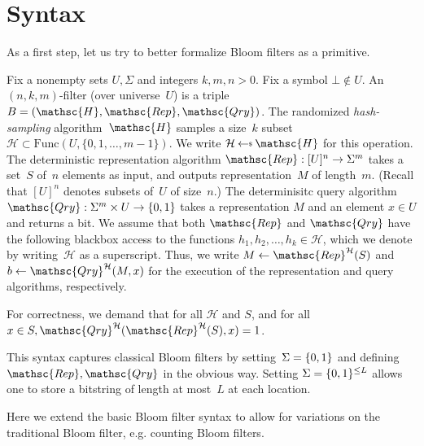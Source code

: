 \section{Syntax}
As a first step, let us try to better formalize Bloom filters as a primitive.

Fix a nonempty sets $U,\Sigma$ and integers $k,m,n>0$.  Fix a symbol $\bot \not\in U$.  An $(n,k,m)$-filter (over universe~$U$) is a triple  $B=(\mathsc{H},\mathsc{Rep},\mathsc{Qry})$.   
%
The randomized \emph{hash-sampling} algorithm~$\mathsc{H}$ samples a size~$k$ subset~$\mathcal{H} \subset \mathrm{Func}(U,\{0,1,\ldots,m-1\})$.  We write $\mathcal{H} \getsr \mathsc{H}$ for this operation.
%
The deterministic representation algorithm $\mathsc{Rep}: [U]^n \rightarrow \Sigma^m$ takes a set~$S$ of~$n$ elements as input, and outputs representation~$M$ of length~$m$.  (Recall that $[U]^n$ denotes subsets of~$U$ of size~$n$.)
%
The determinisitc query algorithm $\mathsc{Qry}: \Sigma^m \times U \rightarrow \bits$ takes a representation $M$ and an element $x \in U$ and returns a bit.  
%
We assume that both $\mathsc{Rep}$ and $\mathsc{Qry}$ have the following blackbox access to the functions $h_1,h_2,\ldots,h_k \in \mathcal{H}$, which we denote by writing~$\mathcal{H}$ as a superscript.   Thus, we write $M \gets \mathsc{Rep}^{\mathcal{H}}(S)$ and $b \gets \mathsc{Qry}^{\mathcal{H}}(M,x)$ for the execution of the representation and query algorithms, respectively.

For correctness, we demand that for all $\mathcal{H}$ and $S$, and for all $x \in S, \mathsc{Qry}^{\mathcal{H}}(\mathsc{Rep}^{\mathcal{H}}(S),x)=1$.  

This syntax captures classical Bloom filters by setting~$\Sigma=\{0,1\}$ and defining $\mathsc{Rep},\mathsc{Qry}$ in the obvious way.  Setting $\Sigma=\{0,1\}^{\leq L}$ allows one to store a bitstring of length at most~$L$ at each location. 


Here we extend the basic Bloom filter syntax to allow for variations on the traditional Bloom filter, e.g. counting Bloom filters.  

